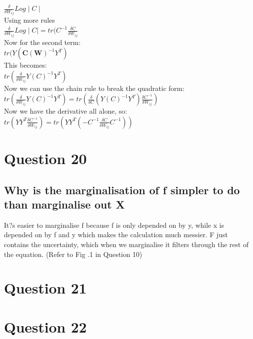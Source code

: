 \documentclass[a4paper, 9pt]{article}
\begin{document}
\( \frac{\delta}{\delta W_{ij}} Log \mid C \mid \) \\
\newline
Using more rules \\

\( \frac{\delta}{\delta W_{ij}} Log \mid C \mid = tr(C^{-1} \frac{\delta C}{\delta W_{ij}} \) \\
\newline
Now for the second term: \\

\( tr(Y (\mathbf{C}(\mathbf{W})^{-1}Y^T) \) \\
\newline
This becomes: \\

\( tr(\frac{\delta}{\delta W_{ij}} Y(C)^{-1}Y^T) \) \\
\newline
Now we can use the chain rule to break the quadratic form: \\

\( tr(\frac{\delta}{\delta W_{ij}} Y(C)^{-1}Y^T) = tr(\frac{\delta}{\delta C} (Y(C)^{-1}Y^T) \frac{\delta C^{-1}}{\delta W_{ij}} ) \) \\
\newline
Now we have the derivative all alone, so: \\ 

\( tr(Y Y^T \frac{\delta C^{-1}}{\delta W_{ij}}) = tr(Y Y^T ( -C^{-1} \frac{\delta C}{\delta W_{ij}} C^{-1})) \)

\section*{Question 20}
\subsection*{Why is the marginalisation of f simpler to do than marginalise out X}
It?s easier to marginalise f because f is only depended on by y, while x is depended on by f and y which makes the calculation much messier. F just contains the uncertainty, which when we marginalise it filters through the rest of the equation. (Refer to Fig .1 in Question 10)

\section*{Question 21}

\section*{Question 22}
\end{document}
